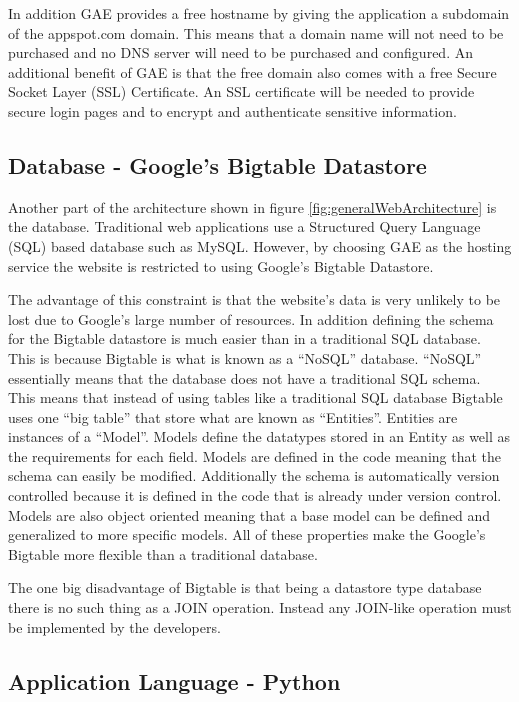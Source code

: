 \documentclass{article}
\begin{document}
In addition GAE provides a free hostname by giving the application a subdomain of the appspot.com domain. This means
that a domain name will not need to be purchased and no DNS server will need to be purchased and configured.
An additional benefit of GAE is that the free domain also comes with a free Secure Socket Layer (SSL) Certificate. An SSL 
certificate will be needed to provide secure login pages and to encrypt and authenticate sensitive information.

\subsection{Database - Google's Bigtable Datastore}

Another part of the architecture shown in figure \ref{fig:generalWebArchitecture} is the database. Traditional web
applications use a Structured Query Language (SQL) based database such as MySQL. However, by choosing GAE as the hosting service the website
is restricted to using Google's Bigtable Datastore.

The advantage of this constraint is that the website's data is very unlikely to be lost due to Google's large number
of resources. In addition defining the schema for the Bigtable datastore is much easier than in a traditional SQL database.
This is because Bigtable is what is known as a ``NoSQL'' database. \cite{google_how_2012} ``NoSQL'' essentially means that the database does not have a traditional SQL schema. This means that instead of using tables like a traditional
SQL database Bigtable uses one ``big table'' that store what are known as ``Entities''. Entities are instances of a ``Model''. Models define the datatypes stored in an Entity as well as the requirements for each field. Models are defined in the code meaning that
the schema can easily be modified. Additionally the schema is automatically version controlled because it is defined in the
code that is already under version control. Models are also object oriented meaning that a base model can be defined and
generalized to more specific models. All of these properties make the Google's Bigtable more flexible than a traditional
database.

The one big disadvantage of Bigtable is that being a datastore type database there is no such thing as a JOIN operation. 
Instead any JOIN-like operation must be implemented by the developers.

\subsection{Application Language - Python}
\end{document}
